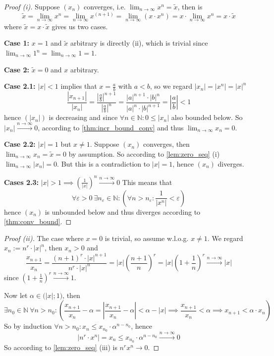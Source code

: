 \begin{proof}[Proof (i)]
   Suppose \((x_n)\) converges, i.e. \(\lim_{n \to \infty} x^n = \tilde{x}\), then is
   \[\tilde{x} = \lim_{n \to \infty} x^n = \lim_{n \to \infty} x^{(n+1)} = \lim_{n \to \infty} (x \cdot x^n) = x \cdot \lim_{n \to \infty} x^n = x \cdot \tilde{x}\]
   where \(\tilde{x} = x \cdot \tilde{x}\) gives us two cases.

   \textbf{Case 1:} \(x = 1\) and \(\tilde{x}\) arbitrary is directly (ii), which is trivial since \(\lim_{n \to \infty} 1^n = \lim_{n \to \infty} 1 = 1\).

   \textbf{Case 2:} \(\tilde{x} = 0\) and \(x\) arbitrary.

   \textbf{Case 2.1:} \(|x| < 1\) implies that \(x = \frac{a}{b}\) with \(a < b\), so we regard \(|x_n| = |x^n| = |x|^n\)
   \[\frac{|x_{n+1}|}{|x_n|} = \frac{\left|\frac{a}{b}\right|^{n+1}}{\left|\frac{a}{b}\right|^n} = \frac{|a|^{n+1}\cdot|b|^n}{|a|^n\cdot|b|^{n+1}} = \left|\frac{a}{b}\right| < 1\]
   hence \((|x_n|)\) is decreasing and since \(\forall n \in \mathbb{N}: 0 \leq |x_n|\) also bounded below.
   So \(|x_n| \xrightarrow{n \to \infty} 0\), according to \cref{thm:incr_bound_conv} and thus \(\lim_{n \to \infty} x_n = 0\).

   \textbf{Case 2.2:} \(|x| = 1\) but \(x \neq 1\).
   Suppose \((x_n)\) converges, then \(\lim_{n \to \infty} x_n = \tilde{x} = 0\) by assumption.
   So according to \cref{lem:zero_seq} (i) \(\lim_{n \to \infty} |x_n| = 0\).
   But this is a contradiction to \(|x| = 1\), hence \((x_n)\) diverges.

   \textbf{Cases 2.3:} \(|x| > 1 \implies \left(\frac{1}{|x|}\right)^n \xrightarrow{n \to \infty} 0\)
   This means that
   \[\forall \varepsilon > 0~\exists n_\varepsilon \in \mathbb{N}: \left(\forall n > n_\varepsilon: \frac{1}{|x^n|} < \varepsilon\right)\]
   hence \((x_n)\) is unbounded below and thus diverges according to \cref{thm:conv_bound}.
\end{proof}
\begin{proof}[Proof (ii)]
   The case where \(x = 0\) is trivial, so assume w.l.o.g. \(x \neq 1\).
   We regard \(x_n := n^r \cdot |x|^n\), then \(x_n > 0\) and
   \[\frac{x_{n+1}}{x_n} = \frac{(n+1)^r \cdot |x|^{n+1}}{n^r \cdot |x|^n} = |x| \left(\frac{n+1}{n}\right)^r = |x| \left(1 + \frac{1}{n}\right)^r \xrightarrow{n \to \infty} |x|\]
   since \(\left(1 + \frac{1}{n}\right)^r \xrightarrow{n \to \infty} 1\).

   Now let \(\alpha \in \big(|x|; 1\big)\), then
   \[\exists n_0 \in \mathbb{N}~\forall n > n_0: \left(\frac{x_{n+1}}{x_n} - \alpha = \left|\frac{x_{n+1}}{x_n} - \alpha\right| < \alpha - |x| \implies \frac{x_{n+1}}{x_n} < \alpha  \implies x_{n+1} < \alpha \cdot x_n\right)\]
   So by induction \(\forall n > n_0: x_n \leq x_{n_0} \cdot \alpha^{n - n_0}\), hence
   \[|n^r \cdot x^n| = x_n \leq x_{n_0} \cdot \alpha^{n-n_0} \xrightarrow{n \to \infty} 0\]
   So according to \cref{lem:zero_seq} (iii) is \(n^rx^n \to 0\).
\end{proof}

